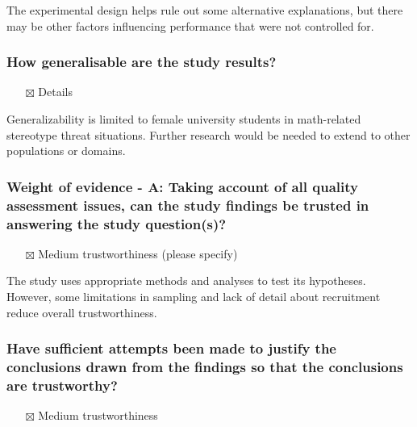 \documentclass[
  doc, a4paper]{apa7}
\providecommand{\tightlist}{%
  \setlength{\itemsep}{0pt}\setlength{\parskip}{0pt}}
\begin{document}
The experimental design helps rule out some alternative explanations, but there may be other factors influencing performance that were not controlled for.

\subsubsection{How generalisable are the study results?}\label{how-generalisable-are-the-study-results}

\begin{itemize}
\tightlist
\item[$\boxtimes$]
  Details
\end{itemize}

Generalizability is limited to female university students in math-related stereotype threat situations. Further research would be needed to extend to other populations or domains.

\subsubsection{Weight of evidence - A: Taking account of all quality assessment issues, can the study findings be trusted in answering the study question(s)?}\label{weight-of-evidence---a-taking-account-of-all-quality-assessment-issues-can-the-study-findings-be-trusted-in-answering-the-study-questions}

\begin{itemize}
\tightlist
\item[$\boxtimes$]
  Medium trustworthiness (please specify)
\end{itemize}

The study uses appropriate methods and analyses to test its hypotheses. However, some limitations in sampling and lack of detail about recruitment reduce overall trustworthiness.

\subsubsection{Have sufficient attempts been made to justify the conclusions drawn from the findings so that the conclusions are trustworthy?}\label{have-sufficient-attempts-been-made-to-justify-the-conclusions-drawn-from-the-findings-so-that-the-conclusions-are-trustworthy}

\begin{itemize}
\tightlist
\item[$\boxtimes$]
  Medium trustworthiness
\end{itemize}
\end{document}

